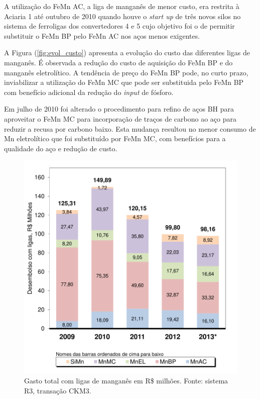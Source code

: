 	A utilização do FeMn AC, a liga de manganês de menor custo, era restrita à Aciaria 1 até outubro de 2010 quando houve o \textit{start up} de três novos silos no sistema de ferroligas dos convertedores 4 e 5 cujo objetivo foi o de permitir substituir o FeMn BP pelo FeMn AC nos aços menos exigentes. 
	
	A Figura (\ref{fig:evol_custo}) apresenta a evolução do custo das diferentes ligas de manganês. É observada a redução do custo de aquisição do FeMn BP e do manganês eletrolítico. A tendência de preço do FeMn BP pode, no curto prazo, inviabilizar a utilização do FeMn MC que pode ser substituida pelo FeMn BP com benefício adicional da redução do \textit{input} de fósforo.

	Em julho de 2010 foi alterado o procedimento para refino de aços BH para aproveitar o FeMn MC para incorporação de traços de carbono ao aço para reduzir a recusa por carbono baixo\cite{it20}. Esta mudança resultou no menor consumo de Mn eletrolítico que foi substituído por FeMn MC, com benefícios para a qualidade do aço e redução de custo.
		\begin{figure}[H]
			\centering
			\includegraphics[scale=0.55, bb=0 0 432 432, trim=0in 0in 0in 0in]{figures/fig02-excel.pdf} %
			\caption{Gasto total com ligas de manganês em R\$ milhões. Fonte: sistema R3, transação CKM3.}
			\label{fig:evol}
		\end{figure}		
